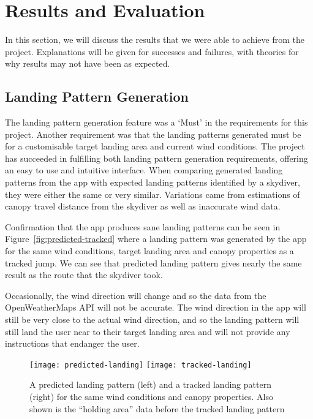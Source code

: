 \section{Results and Evaluation}\label{sec:results-and-evaluation}
In this section, we will discuss the results that we were able to achieve from the project. Explanations will be given for successes and failures, with theories for why results may not have been as expected.


\subsection{Landing Pattern Generation}
The landing pattern generation feature was a `Must' in the requirements for this project. Another requirement was that the landing patterns generated must be for a customisable target landing area and current wind conditions.
The project has succeeded in fulfilling both landing pattern generation requirements, offering an easy to use and intuitive interface.
When comparing generated landing patterns from the app with expected landing patterns identified by a skydiver, they were either the same or very similar. Variations came from estimations of canopy travel distance from the skydiver as well as inaccurate wind data.

Confirmation that the app produces sane landing patterns can be seen in Figure~\vref{fig:predicted-tracked} where a landing pattern was generated by the app for the same wind conditions, target landing area and canopy properties as a tracked jump. We can see that predicted landing pattern gives nearly the same result as the route that the skydiver took.

Occasionally, the wind direction will change and so the data from the OpenWeatherMaps API will not be accurate. The wind direction in the app will still be very close to the actual wind direction, and so the landing pattern will still land the user near to their target landing area and will not provide any instructions that endanger the user.

\begin{figure}[ht]
  \centering
  \texttt{[image: predicted-landing]}
  \hspace{1cm}
  \texttt{[image: tracked-landing]}
  \caption{A predicted landing pattern (left) and a tracked landing pattern (right) for the same wind conditions and canopy properties. Also shown is the ``holding area'' data before the tracked landing pattern}\label{fig:predicted-tracked}
\end{figure}

